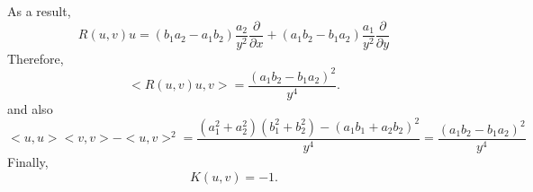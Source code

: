 \documentclass[11pt]{amsart}
\begin{document}
As a result,
\begin{equation}
R(u,v)u=(b_1 a_2-a_1 b_2)\frac{a_2}{y^2}\frac{\partial}{\partial x}+(a_1 b_2-b_1 a_2)\frac{a_1}{y^2}\frac{\partial}{\partial y}
\end{equation}
Therefore,
\begin{equation}
<R(u,v)u,v>=\frac{(a_1 b_2-b_1 a_2)^2}{y^4}.
\end{equation}
and also
\begin{equation}
<u,u><v,v>-<u,v>^2=\frac{(a_{1}^2+a_{2}^2)(b_{1}^2+b_{2}^2)- (a_1 b_1+ a_2 b_2)^2}{y^4}=\frac{(a_1 b_2-b_1 a_2)^2}{y^4}
\end{equation}
Finally,
\begin{equation}
K(u,v)=-1.
\end{equation} 
\end{document}
